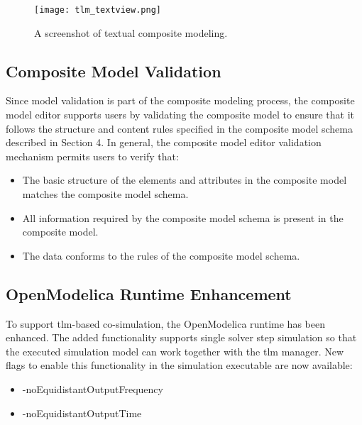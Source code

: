 \begin{landscape}
\begin{figure}
	\texttt{[image: tlm\_textview.png]}
	\caption{A screenshot of textual composite modeling.}
	\label{fig:tlmtextview}
\end{figure}
\end{landscape}

\subsection{Composite Model Validation}
\label{sec:tlmvalidation}

Since model validation is part of the composite modeling process, the composite model editor supports users by validating the composite model to ensure that it follows the structure and content rules specified in the composite model schema described in Section 4. In general, the composite model
editor validation mechanism permits users to verify that: 

\begin{itemize}

\item The basic structure of the elements and attributes in the composite model matches the composite model schema.
\item All information required by the composite model schema is present in the composite model.
\item The data conforms to the rules of the composite model schema.

\end{itemize}

\subsection{OpenModelica Runtime Enhancement}
\label{sec:tlmruntime}

To support \acrshort{tlm}-based co-simulation, the OpenModelica runtime has been enhanced. The added
functionality supports single solver step simulation so that the executed simulation model can work together
with the \acrshort{tlm} manager. New flags to enable this functionality in the simulation executable are now available:

\begin{itemize}
		
\item -noEquidistantOutputFrequency
\item -noEquidistantOutputTime

\end{itemize}

